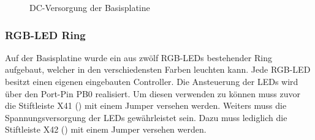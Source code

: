 \begin{figure}[H]
    \centering
    \qquad
    \qquad
    \caption[DC-Versorgung der Basisplatine]{DC-Versorgung der \gls{Basisplatine}}
    \label{fig:basisplatine-dc}
\end{figure}

\subsubsection{RGB-LED Ring \cite{basis:ws2812b}}
Auf der \gls{Basisplatine} wurde ein aus zwölf RGB-LEDs bestehender Ring aufgebaut, welcher in den verschiedensten Farben leuchten kann. Jede RGB-LED besitzt einen eigenen eingebauten Controller. Die Ansteuerung der LEDs wird über den Port-Pin PB0 realisiert. Um diesen verwenden zu können muss zuvor die Stiftleiste X41 () mit einem Jumper versehen werden. Weiters muss die Spannungsversorgung der LEDs gewährleistet sein. Dazu muss lediglich die Stiftleiste X42 () mit einem Jumper versehen werden.

